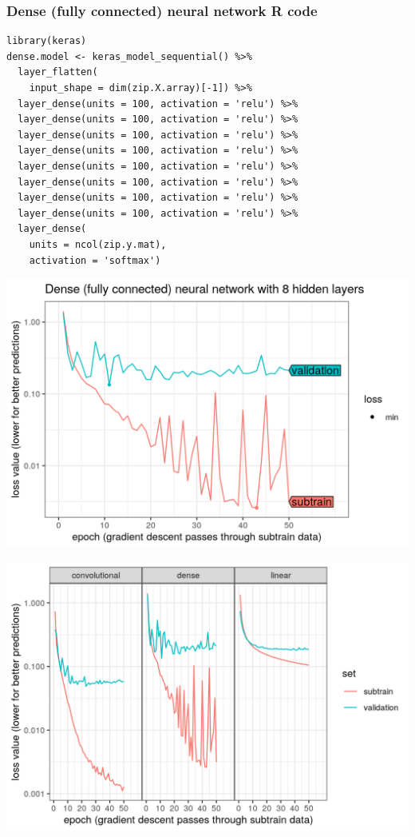 \documentclass{beamer}
\begin{document}
\begin{frame}[fragile]
  \frametitle{Dense (fully connected) neural network R code}

\begin{verbatim}
library(keras)
dense.model <- keras_model_sequential() %>%
  layer_flatten(
    input_shape = dim(zip.X.array)[-1]) %>%
  layer_dense(units = 100, activation = 'relu') %>% 
  layer_dense(units = 100, activation = 'relu') %>% 
  layer_dense(units = 100, activation = 'relu') %>% 
  layer_dense(units = 100, activation = 'relu') %>%
  layer_dense(units = 100, activation = 'relu') %>%
  layer_dense(units = 100, activation = 'relu') %>% 
  layer_dense(units = 100, activation = 'relu') %>%   
  layer_dense(units = 100, activation = 'relu') %>% 
  layer_dense(
    units = ncol(zip.y.mat), 
    activation = 'softmax')
\end{verbatim}

\end{frame}
 
\begin{frame}
  \includegraphics[width=\textwidth]{figure-validation-loss-dense}
\end{frame}
 
\begin{frame}
  \includegraphics[width=\textwidth]{figure-validation-loss-three}
\end{frame}
\end{document}
